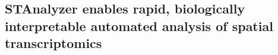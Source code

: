 \documentclass[a4,center,fleqn]{NAR}
\begin{document}
\subsection{STAnalyzer enables rapid, biologically interpretable automated analysis of spatial transcriptomics}




\end{document}
